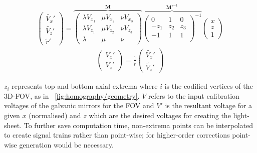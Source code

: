 \begin{align}
  \begin{pmatrix}
  \widetilde{V_x}'\\
  \widetilde{V_z}' \\
  \widetilde{r}'
  \end{pmatrix}
  =\overbrace{
  \begin{pmatrix}
  \lambda V_{x_1} & \mu V_{x_2} & \nu V_{x_3} \\
  \lambda V_{z_1} & \mu V_{z_2} & \nu V_{z_3} \\
  \lambda & \mu & \nu
\end{pmatrix}}^{\textbf{M}}
  \overbrace{
  \begin{pmatrix}
      0 & 1 & 0 \\
      -z_1 & z_2 & z_3 \\
      -1 & 1 & 1 \\
    \end{pmatrix}^{-1}}^{\textbf{M}'^{-1}}
  \begin{pmatrix}
  x\\
  z \\
  1
  \end{pmatrix}\nonumber
\end{align}
  \begin{align}
  \begin{pmatrix}
    V_x'\\
    V_z'
  \end{pmatrix} = \frac{1}{\widetilde{r}}
  \begin{pmatrix}
  \widetilde{V_x}'\\
  \widetilde{V_z}'
  \end{pmatrix}
\end{align}

\(z_i\) represents top and bottom axial extrema where \(i\) is the codified vertices of the \gls{3D}-\gls{FOV}, as in \figurename~\ref{fig:homography/geometry}.
\(V\) refers to the input calibration voltages of the galvanic mirrors for the \gls{FOV} and \(V' \) is the resultant voltage for a given \(x \) (normalised) and \(z\) which are the desired voltages for creating the  \gls{light-sheet}.
To further save computation time,
non-extrema points can be interpolated to create signal trains rather than point-wise; for higher-order corrections point-wise generation would be necessary.

